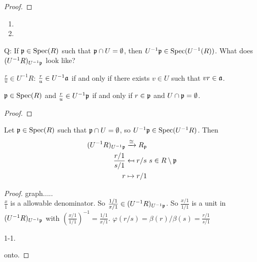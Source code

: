 \begin{proof}

\end{proof}

\begin{example*}
    \begin{enumerate}
        \item 
        \item 
    \end{enumerate}
\end{example*}

Q: If $\mathfrak{p} \in \operatorname{Spec}(R)$ such that $\mathfrak{p} \cap U = \emptyset$, then $U^{-1}\mathfrak{p} \in \operatorname{Spec}(U^{-1}(R))$. What does $(U^{-1}R)_{U^{-1}\mathfrak{p}}$ look like?

\begin{recall*}
    $\frac{r}{u} \in U^{-1}R$: $\frac{r}{u} \in U^{-1}\mathfrak{a}$ if and only if there exists $v \in U$ such that $vr \in \mathfrak{a}$.
\end{recall*}

\begin{lemma}
    $\mathfrak{p} \in \operatorname{Spec}(R)$ and $\frac{r}{u} \in U^{-1}\mathfrak{p}$ if and only if $r \in \mathfrak{p}$ and $U \cap \mathfrak{p} = \emptyset$.
\end{lemma}

\begin{proof}

\end{proof}

\begin{proposition}
    Let $\mathfrak{p} \in \operatorname{Spec}(R)$ such that $\mathfrak{p} \cap U = \emptyset$, so $U^{-1}\mathfrak{p} \in \operatorname{Spec}(U^{-1}R)$. Then 
    \begin{align*}
        (U^{-1}R)_{U^{-1}\mathfrak{p}} &\xrightarrow \cong R_{\mathfrak{p}} \\
        \frac{r/1}{s/1} &\mapsfrom r/s \ s \in R \setminus \mathfrak{p} \\
        r &\mapsto r/1
    \end{align*}
\end{proposition}

\begin{proof}
    graph..... \\
    $\frac{x}{1}$ is a allowable denominator. So $\frac{1/1}{x/1} \in (U^{-1}R)_{U^{-1}\mathfrak{p}}$. So $\frac{x/1}{1/1}$ is a unit in $(U^{-1}R)_{U^{-1}\mathfrak{p}}$ with $(\frac{x/1}{1/1})^{-1} = \frac{1/1}{x/1}$. $\varphi(r/s) = \beta(r)/\beta(s) = \frac{r/1}{s/1}$ \par 
    1-1. \par 
    onto. \par 
\end{proof}

